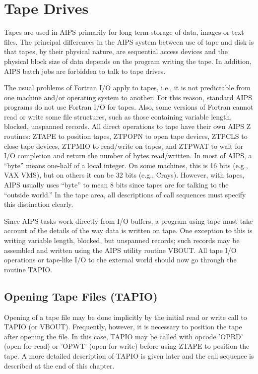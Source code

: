 \section{Tape Drives}

Tapes are used in AIPS primarily for long term storage of data,
images or text files.  The principal differences in the AIPS system
between use of tape and disk is that tapes, by their physical nature,
are sequential access devices and the physical block size of data
depends on the program writing the tape.  In addition, AIPS batch jobs
are forbidden to talk to tape drives.

The usual problems of Fortran I/O apply to tapes, i.e., it is not
predictable from one machine and/or operating system to another.  For
this reason, standard AIPS programs do not use Fortran I/O for tapes.
Also, some versions of Fortran cannot read or write some file
structures, such as those containing variable length, blocked,
unspanned records.  All direct operations to tape have their own AIPS
Z routines: ZTAPE to position tapes, ZTPOPN
to open tape devices, ZTPCLS to close tape devices,
ZTPMIO to read/write on tapes, and ZTPWAT
to wait for I/O completion and return the number of bytes
read/written.  In most of AIPS, a ``byte'' means one-half of a local
integer.  On some machines, this is 16 bits (e.g., VAX VMS), but on
others it can be 32 bits (e.g., Crays).  However, with tapes, AIPS
usually uses ``byte'' to mean 8 bits since tapes are for talking to
the ``outside world.''  In the tape area, all descriptions of call
sequences must specify this distinction clearly.

 Since AIPS tasks work directly from I/O buffers, a program using tape
must take account of the details of the way data is written on tape.
One exception to this is writing variable length, blocked, but
unspanned records; such records may be assembled and written using the
AIPS utility routine VBOUT. All tape I/O operations or tape-like I/O
to the external world should now go through the routine TAPIO.

\subsection{Opening Tape Files (TAPIO)}

Opening of a tape file may be done implicitly by the initial read or
write call to TAPIO (or VBOUT).  Frequently, however, it is necessary
to position the tape after opening the file.  In this case, TAPIO may
be called with opcode 'OPRD' (open for read) or 'OPWT' (open for
write) before using ZTAPE to position the tape. A more detailed
description of TAPIO is given later and the call sequence is described
at the end of this chapter.

